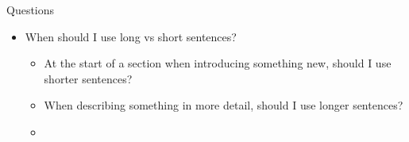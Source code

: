 \label{notes__09000-questions.md}
\begin{frame}{Questions}
\label{notes__09000-questions.md__questions}
\begin{itemize}
\tightlist
\item
  When should I use long vs short sentences?

  \begin{itemize}
  \tightlist
  \item
    At the start of a section when introducing something new, should I use shorter sentences?
  \item
    When describing something in more detail, should I use longer sentences?
  \item
  \end{itemize}
\end{itemize}
\end{frame}

